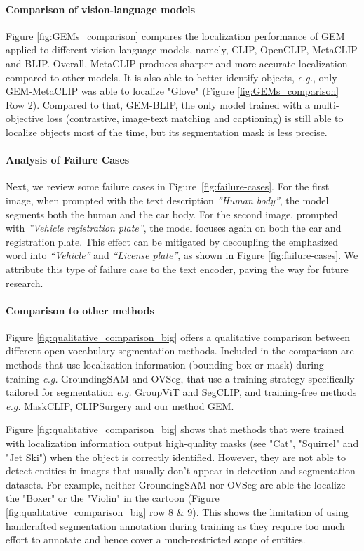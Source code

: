 \documentclass[10pt,twocolumn,letterpaper]{article}
\begin{document}
\paragraph{Comparison of vision-language models}
Figure \ref{fig:GEMs_comparison} compares the localization performance of GEM applied to different vision-language models, namely, CLIP, OpenCLIP, MetaCLIP and BLIP. Overall, MetaCLIP produces sharper and more accurate localization compared to other models. It is also able to better identify objects, \textit{e.g.}, only GEM-MetaCLIP was able to localize "Glove" (Figure \ref{fig:GEMs_comparison} Row 2). Compared to that, GEM-BLIP, the only model trained with a multi-objective loss (contrastive, image-text matching and captioning) is still able to localize objects most of the time, but its segmentation mask is less precise. 
\vspace{-1em}
\paragraph{Analysis of Failure Cases}
Next, we review some failure cases in Figure~\ref{fig:failure-cases}. For the first image, when prompted with the text description \textit{''Human body''}, the model segments both the human and the car body. For the second image, prompted with \textit{''Vehicle registration plate''}, the model focuses again on both the car and registration plate. 
This effect can be mitigated by decoupling the emphasized word into  \textit{``Vehicle''} and \textit{``License plate''}, as shown in Figure \ref{fig:failure-cases}. We attribute this type of failure case to the text encoder, paving the way for future research.
\vspace{-1em}
\paragraph{Comparison to other methods}
Figure \ref{fig:qualitative_comparison_big} offers a qualitative comparison between different open-vocabulary segmentation methods. Included in the comparison are methods that use localization information (bounding box or mask) during training \textit{e.g.} GroundingSAM and OVSeg, that use a training strategy specifically tailored for segmentation \textit{e.g.} GroupViT and SegCLIP, and training-free methods \textit{e.g.} MaskCLIP, CLIPSurgery and our method GEM.

Figure \ref{fig:qualitative_comparison_big} shows that methods that were trained with localization information output high-quality masks (see "Cat", "Squirrel" and "Jet Ski") when the object is correctly identified. However, they are not able to detect entities in images that usually don't appear in detection and segmentation datasets. For example, neither GroundingSAM nor OVSeg are able the localize the "Boxer" or the "Violin" in the cartoon (Figure \ref{fig:qualitative_comparison_big} row 8 \& 9). This shows the limitation of using handcrafted segmentation annotation during training as they require too much effort to annotate and hence cover a much-restricted scope of entities. 
\end{document}
